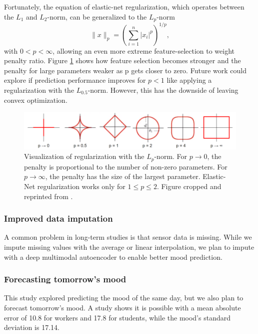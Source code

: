 \documentclass[conference]{IEEEtran}
\begin{document}
Fortunately, the equation of elastic-net regularization, which operates between the $L_1$ and $L_2$-norm, can be generalized to the $L_p$-norm
\begin{equation}
\|x\|_{p}=\left(\sum_{i=1}^{n}\left|x_{i}\right|^{p}\right)^{1 / p},
\end{equation}
with $0<p<\infty$, allowing an even more extreme feature-selection to weight penalty ratio.
Figure \ref{fig:reg} shows how feature selection becomes stronger and the penalty for large parameters weaker as p gets closer to zero. Future work could explore if prediction performance improves for $p<1$ like applying a regularization with the $L_{0.5}$-norm. However, this has the downside of leaving convex optimization\cite{xu_l12_2012}.
\begin{figure}[htbp]
\begin{center}
\includegraphics[width=1\linewidth]{figs/Regularization_ Different P-Norms.png}
\caption{Visualization of regularization with the $L_p$-norm. For $p\to 0$, the penalty is proportional to the number of non-zero parameters. For $p\to \infty$, the penalty has the size of the largest parameter. Elastic-Net regularization works only for $1 \leq p  \leq2$. Figure cropped and reprinted from \cite{binz_kevin_intro_2019}.}
\label{fig:reg}
\end{center}
\end{figure}


\subsubsection{Improved data imputation}
 A common problem in long-term studies is that sensor data is missing. While we impute missing values with the average or linear interpolation, we plan to impute with a deep multimodal autoencoder to enable better mood prediction\cite{jaques_multimodal_2017}.
 
 
 \subsubsection{Forecasting tomorrow's mood}
This study explored predicting the mood of the same day, but we also plan to forecast tomorrow's mood. A study shows it is possible with a mean absolute error of 10.8 for workers and 17.8 for students, while the mood's standard deviation is 17.14\cite{umematsu_forecasting_2020}.
\end{document}
